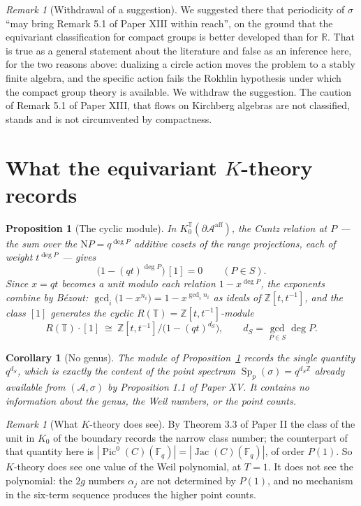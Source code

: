 \documentclass[11pt]{amsart}
\numberwithin{equation}{section}
\newtheorem{proposition}[theorem]{Proposition}
\newtheorem{corollary}[theorem]{Corollary}
\theoremstyle{definition}
\theoremstyle{remark}
\newtheorem{remark}[theorem]{Remark}
\newcommand{\Z}{\mathbb{Z}}
\newcommand{\R}{\mathbb{R}}
\newcommand{\F}{\mathbb{F}}
\newcommand{\T}{\mathbb{T}}
\newcommand{\cA}{\mathcal{A}}
\newcommand{\Ns}{\mathrm{N}}
\newcommand{\Pic}{\operatorname{Pic}}
\newcommand{\Jac}{\operatorname{Jac}}
\newcommand{\Sp}{\operatorname{Sp}}
\begin{document}
\begin{remark}[Withdrawal of a suggestion]\label{rem:withdraw}
We suggested there that periodicity of $\sigma$ ``may bring Remark 5.1 of Paper XIII within
reach'', on the ground that the equivariant classification for compact groups is better
developed than for $\R$. That is true as a general statement about the literature and false
as an inference here, for the two reasons above: dualizing a circle action moves the problem
to a stably finite algebra, and the specific action fails the Rokhlin hypothesis under which
the compact group theory is available. We withdraw the suggestion. The caution of
Remark 5.1 of Paper XIII, that flows on Kirchberg algebras are not classified, stands and
is not circumvented by compactness.
\end{remark}

\section{What the equivariant $K$-theory records}

\begin{proposition}[The cyclic module]\label{prop:KT}
In $K_0^\T(\partial\cA^{\mathrm{aff}})$, the Cuntz relation at $P$ --- the sum over the
$\Ns P=q^{\deg P}$ additive cosets of the range projections, each of weight $t^{\deg P}$ ---
gives
\[
\bigl(1-(qt)^{\deg P}\bigr)\,[1]=0\qquad(P\in S).
\]
Since $x=qt$ becomes a unit modulo each relation $1-x^{\deg P}$, the exponents combine by
B\'ezout: $\gcd_i\bigl(1-x^{n_i}\bigr)=1-x^{\gcd_in_i}$ as ideals of $\Z[t,t^{-1}]$, and the
class $[1]$ generates the cyclic $R(\T)=\Z[t,t^{-1}]$-module
\[
R(\T)\cdot[1]\ \cong\ \Z[t,t^{-1}]\big/\bigl(1-(qt)^{d_S}\bigr),\qquad d_S=\gcd_{P\in S}\deg P .
\]
\end{proposition}

\begin{corollary}[No genus]\label{cor:nogenus}
The module of Proposition~\ref{prop:KT} records the single quantity $q^{d_S}$, which is
exactly the content of the point spectrum $\Sp_p(\sigma)=q^{d_S\Z}$ already available from
$(\cA,\sigma)$ by Proposition 1.1 of Paper XV. It contains no information about the genus, the
Weil numbers, or the point counts.
\end{corollary}

\begin{remark}[What $K$-theory does see]\label{rem:whatKsees}
By Theorem 3.3 of Paper II the class of the unit in $K_0$ of the boundary records the
narrow class number; the counterpart of that quantity here is
$|\Pic^0(C)(\F_q)|=|\Jac(C)(\F_q)|$, of order $P(1)$. So $K$-theory does see
one value of the Weil polynomial, at $T=1$. It does not see the polynomial: the $2g$
numbers $\alpha_j$ are not determined by $P(1)$, and no mechanism in the six-term sequence
produces the higher point counts.
\end{remark}
\end{document}
